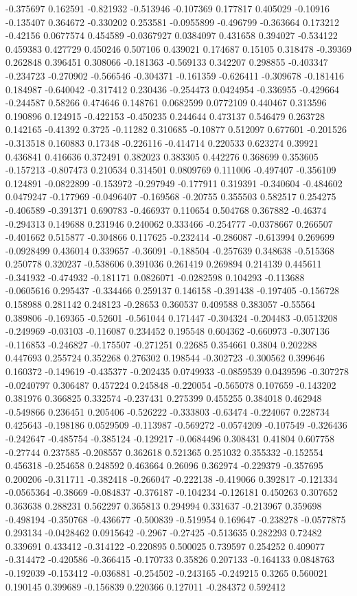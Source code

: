 -0.375697 0.162591 -0.821932 -0.513946 -0.107369 0.177817 0.405029 -0.10916 -0.135407 0.364672 -0.330202 0.253581 -0.0955899 -0.496799 -0.363664 0.173212 -0.42156 0.0677574 0.454589 -0.0367927 0.0384097 0.431658 0.394027 -0.534122 0.459383 0.427729 0.450246 0.507106 0.439021 0.174687 0.15105 0.318478 -0.39369 0.262848 0.396451 0.308066 -0.181363 -0.569133 0.342207 0.298855 -0.403347 -0.234723 -0.270902 -0.566546 -0.304371 -0.161359 -0.626411 -0.309678 -0.181416 0.184987 -0.640042 -0.317412 0.230436 -0.254473 0.0424954 -0.336955 -0.429664 -0.244587 0.58266 0.474646 0.148761 0.0682599 0.0772109 0.440467 0.313596 0.190896 0.124915 -0.422153 -0.450235 0.244644 0.473137 0.546479 0.263728 0.142165 -0.41392 0.3725 -0.11282 0.310685 -0.10877 0.512097 0.677601 -0.201526 -0.313518 0.160883 0.17348 -0.226116 -0.414714 0.220533 0.623274 0.39921 0.436841 0.416636 0.372491 0.382023 0.383305 0.442276 0.368699 0.353605 -0.157213 -0.807473 0.210534 0.314501 0.0809769 0.111006 -0.497407 -0.356109 0.124891 -0.0822899 -0.153972 -0.297949 -0.177911 0.319391 -0.340604 -0.484602 0.0479247 -0.177969 -0.0496407 -0.169568 -0.20755 0.355503 0.582517 0.254275 -0.406589 -0.391371 0.690783 -0.466937 0.110654 0.504768 0.367882 -0.46374 -0.294313 0.149688 0.231946 0.240062 0.333466 -0.254777 -0.0378667 0.266507 -0.401662 0.515877 -0.304866 0.117625 -0.232414 -0.286087 -0.613994 0.269699 -0.0928499 0.436014 0.339657 -0.36091 -0.188504 -0.257639 0.348638 -0.515368 0.250778 0.320237 -0.538606 0.391036 0.261419 0.269894 0.214139 0.445611 -0.341932 -0.474932 -0.181171 0.0826071 -0.0282598 0.104293 -0.113688 -0.0605616 0.295437 -0.334466 0.259137 0.146158 -0.391438 -0.197405 -0.156728 0.158988 0.281142 0.248123 -0.28653 0.360537 0.409588 0.383057 -0.55564 0.389806 -0.169365 -0.52601 -0.561044 0.171447 -0.304324 -0.204483 -0.0513208 -0.249969 -0.03103 -0.116087 0.234452 0.195548 0.604362 -0.660973 -0.307136 -0.116853 -0.246827 -0.175507 -0.271251 0.22685 0.354661 0.3804 0.202288 0.447693 0.255724 0.352268 0.276302 0.198544 -0.302723 -0.300562 0.399646 0.160372 -0.149619 -0.435377 -0.202435 0.0749933 -0.0859539 0.0439596 -0.307278 -0.0240797 0.306487 0.457224 0.245848 -0.220054 -0.565078 0.107659 -0.143202 0.381976 0.366825 0.332574 -0.237431 0.275399 0.455255 0.384018 0.462948 -0.549866 0.236451 0.205406 -0.526222 -0.333803 -0.63474 -0.224067 0.228734 0.425643 -0.198186 0.0529509 -0.113987 -0.569272 -0.0574209 -0.107549 -0.326436 -0.242647 -0.485754 -0.385124 -0.129217 -0.0684496 0.308431 0.41804 0.607758 -0.27744 0.237585 -0.208557 0.362618 0.521365 0.251032 0.355332 -0.152554 0.456318 -0.254658 0.248592 0.463664 0.26096 0.362974 -0.229379 -0.357695 0.200206 -0.311711 -0.382418 -0.266047 -0.222138 -0.419066 0.392817 -0.121334 -0.0565364 -0.38669 -0.084837 -0.376187 -0.104234 -0.126181 0.450263 0.307652 0.363638 0.288231 0.562297 0.365813 0.294994 0.331637 -0.213967 0.359698 -0.498194 -0.350768 -0.436677 -0.500839 -0.519954 0.169647 -0.238278 -0.0577875 0.293134 -0.0428462 0.0915642 -0.2967 -0.27425 -0.513635 0.282293 0.72482 0.339691 0.433412 -0.314122 -0.220895 0.500025 0.739597 0.254252 0.409077 -0.314472 -0.420586 -0.366415 -0.170733 0.35826 0.207133 -0.164133 0.0848763 -0.192039 -0.153412 -0.036881 -0.254502 -0.243165 -0.249215 0.3265 0.560021 0.190145 0.399689 -0.156839 0.220366 0.127011 -0.284372 0.592412 